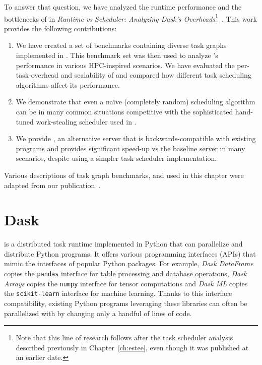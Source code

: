 To answer that question, we have analyzed the runtime performance and the bottlenecks of
\dask{} in
\emph{Runtime vs Scheduler: Analyzing Dask's Overheads}\footnote{Note that this line of research follows after the task scheduler analysis described previously in
Chapter~\ref{ch:estee}, even though it was published at an earlier date.}~\cite{rsds}. This work
provides the following contributions:
\begin{enumerate}
	\item We have created a set of benchmarks containing diverse task graphs implemented in
	      \dask{}. This benchmark set was then used to analyze \dask{}'s
	      performance in various HPC-inspired scenarios. We have evaluated the per-task-overhead and
	      scalability of \dask{} and compared how different task scheduling algorithms
	      affect its performance.
	\item We demonstrate that even a naïve (completely random) scheduling algorithm can be in many common
	      situations competitive with the sophisticated hand-tuned work-stealing scheduler used in
	      \dask{}.
	\item We provide \rsds{}, an alternative \dask{} server that is
	      backwards-compatible with existing \dask{} programs and provides significant
	      speed-up vs the baseline \dask{} server in many scenarios, despite using a
	      simpler task scheduler implementation.
\end{enumerate}

Various descriptions of task graph benchmarks, \dask{} and
\rsds{} used in this chapter were adapted from our
publication~\cite{rsds}.


\section{Dask}
\label{sec:rsds-dask}
\dask{} is a distributed task runtime implemented in Python that can
parallelize and distribute Python programs. It offers various programming interfaces (APIs) that
mimic the interfaces of popular Python packages. For example, \emph{Dask DataFrame} copies
the \texttt{pandas} interface for table processing and
database operations, \emph{Dask Arrays} copies the
\texttt{numpy} interface for tensor computations and
\emph{Dask ML} copies the \texttt{scikit-learn}
interface for machine learning. Thanks to this interface compatibility, existing Python programs
leveraging these libraries can often be parallelized with \dask{} by changing
only a handful of lines of code.

